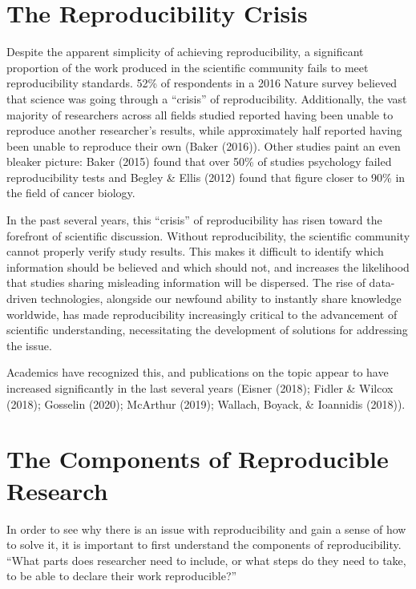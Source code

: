 \documentclass[12pt,twoside]{reedthesis}
\begin{document}
\hypertarget{the-reproducibility-crisis}{%
\section{The Reproducibility Crisis}\label{the-reproducibility-crisis}}

Despite the apparent simplicity of achieving reproducibility, a significant proportion of the work produced in the scientific community fails to meet reproducibility standards. 52\% of respondents in a 2016 Nature survey believed that science was going through a ``crisis'' of reproducibility. Additionally, the vast majority of researchers across all fields studied reported having been unable to reproduce another researcher's results, while approximately half reported having been unable to reproduce their own (Baker (2016)). Other studies paint an even bleaker picture: Baker (2015) found that over 50\% of studies psychology failed reproducibility tests and Begley \& Ellis (2012) found that figure closer to 90\% in the field of cancer biology.

In the past several years, this ``crisis'' of reproducibility has risen toward the forefront of scientific discussion. Without reproducibility, the scientific community cannot properly verify study results. This makes it difficult to identify which information should be believed and which should not, and increases the likelihood that studies sharing misleading information will be dispersed. The rise of data-driven technologies, alongside our newfound ability to instantly share knowledge worldwide, has made reproducibility increasingly critical to the advancement of scientific understanding, necessitating the development of solutions for addressing the issue.

Academics have recognized this, and publications on the topic appear to have increased significantly in the last several years (Eisner (2018); Fidler \& Wilcox (2018); Gosselin (2020); McArthur (2019); Wallach, Boyack, \& Ioannidis (2018)).

\hypertarget{the-components-of-reproducible-research}{%
\section{The Components of Reproducible Research}\label{the-components-of-reproducible-research}}

In order to see why there is an issue with reproducibility and gain a sense of how to solve it, it is important to first understand the components of reproducibility. ``What parts does researcher need to include, or what steps do they need to take, to be able to declare their work reproducible?''
\end{document}
